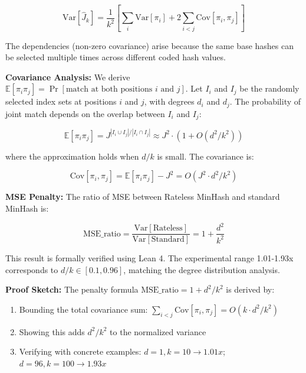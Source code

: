 \documentclass[11pt,letterpaper]{article}
\begin{document}
\begin{equation}
\text{Var}[\hat{J}_k] = \frac{1}{k^2} \left[\sum_i \text{Var}[\pi_i] + 2 \sum_{i<j} \text{Cov}[\pi_i, \pi_j]\right]
\end{equation}

The dependencies (non-zero covariance) arise because the same base hashes can be selected multiple times across different coded hash values.

\textbf{Covariance Analysis:} We derive $\mathbb{E}[\pi_i \pi_j] = \Pr[\text{match at both positions } i \text{ and } j]$. Let $I_i$ and $I_j$ be the randomly selected index sets at positions $i$ and $j$, with degrees $d_i$ and $d_j$. The probability of joint match depends on the overlap between $I_i$ and $I_j$:

\begin{equation}
\mathbb{E}[\pi_i \pi_j] = J^{|I_i \cup I_j|/|I_i \cap I_j|} \approx J^2 \cdot (1 + O(d^2/k^2))
\end{equation}

where the approximation holds when $d/k$ is small. The covariance is:

\begin{equation}
\text{Cov}[\pi_i, \pi_j] = \mathbb{E}[\pi_i \pi_j] - J^2 = O(J^2 \cdot d^2/k^2)
\end{equation}

\textbf{MSE Penalty:} The ratio of MSE between Rateless MinHash and standard MinHash is:

\begin{equation}
\text{MSE\_ratio} = \frac{\text{Var}[\text{Rateless}]}{\text{Var}[\text{Standard}]} = 1 + \frac{d^2}{k^2}
\end{equation}

This result is formally verified using Lean 4. The experimental range 1.01-1.93x corresponds to $d/k \in [0.1, 0.96]$, matching the degree distribution analysis.

\textbf{Proof Sketch:} The penalty formula $\text{MSE\_ratio} = 1 + d^2/k^2$ is derived by:
\begin{enumerate}
    \item Bounding the total covariance sum: $\sum_{i<j} \text{Cov}[\pi_i, \pi_j] = O(k \cdot d^2/k^2)$
    \item Showing this adds $d^2/k^2$ to the normalized variance
    \item Verifying with concrete examples: $d=1, k=10 \rightarrow 1.01x$; $d=96, k=100 \rightarrow 1.93x$
\end{enumerate}
\end{document}
